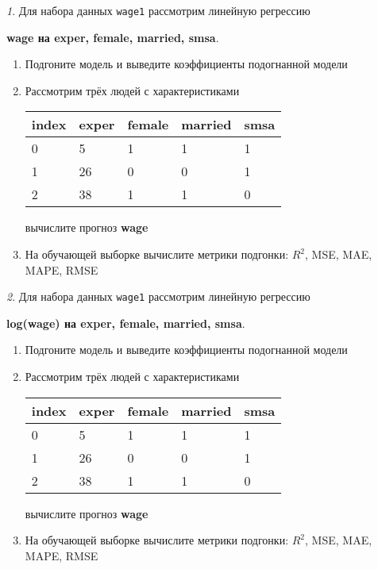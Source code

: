 \documentclass[12pt]{article}
\theoremstyle{remark}
\newtheorem{exercise}{}[section]
\begin{document}
\begin{exercise}
Для набора данных \texttt{wage1} рассмотрим линейную регрессию 
\begin{center}
	\textbf{wage на exper, female, married, smsa}.
\end{center}
\begin{enumerate}
	\item Подгоните модель и выведите коэффициенты подогнанной модели
	\item Рассмотрим трёх людей с характеристиками
	\begin{center}
		\begin{tabular}{|l||l|l|l|l|}\hline
			index & exper & female & married & smsa \\ \hline\hline
			0 & 5 & 1 & 1 & 1  \\
			1 & 26 & 0 & 0 & 1 \\
			2 & 38 & 1 & 1 & 0 \\ \hline
		\end{tabular}
	\end{center}
	вычислите прогноз \textbf{wage}
	\item На обучающей выборке вычислите метрики подгонки: \(R^2\), 
	MSE, MAE, MAPE, RMSE
\end{enumerate}
\end{exercise}

\begin{exercise}
Для набора данных \texttt{wage1} рассмотрим линейную регрессию 
\begin{center}
	\textbf{log(wage) на exper, female, married, smsa}.
\end{center}
\begin{enumerate}
	\item Подгоните модель и выведите коэффициенты подогнанной модели
	\item Рассмотрим трёх людей с характеристиками
	\begin{center}
		\begin{tabular}{|l||l|l|l|l|}\hline
			index & exper & female & married & smsa \\ \hline\hline
			0 & 5 & 1 & 1 & 1  \\
			1 & 26 & 0 & 0 & 1 \\
			2 & 38 & 1 & 1 & 0 \\ \hline
		\end{tabular}
	\end{center}
	вычислите прогноз \textbf{wage}
	\item На обучающей выборке вычислите метрики подгонки: \(R^2\), 
	MSE, MAE, MAPE, RMSE
\end{enumerate}
\end{exercise}
\end{document}
